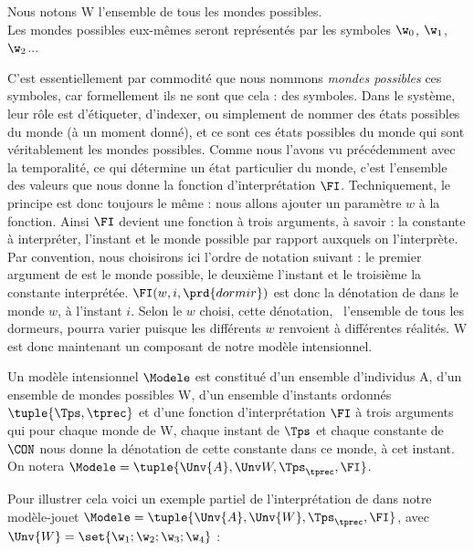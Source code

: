 \begin{nota}
Nous notons \Unv W l'ensemble de tous les mondes possibles.\\
Les mondes possibles eux-mêmes seront représentés par les symboles $\w_0$, $\w_1$, $\w_2$...
\end{nota}


C'est essentiellement par commodité que nous nommons \emph{mondes possibles} ces symboles, car formellement ils ne sont que cela : des symboles.  Dans le système, leur rôle est d'étiqueter, d'indexer, ou simplement de nommer des états possibles du monde (à un moment donné), et ce sont ces états possibles du monde qui sont véritablement les mondes possibles.  Comme nous l'avons vu précédemment avec la temporalité, ce qui détermine un état particulier du monde, c'est l'ensemble des valeurs que nous donne la fonction d'interprétation $\FI$. 
Techniquement, le principe est donc toujours le même :
nous allons ajouter un paramètre $w$ à la fonction.
Ainsi 
$\FI$ devient une fonction à trois arguments, à savoir : la constante à
interpréter, l'instant et le monde possible par rapport auxquels on
l'interprète.  Par convention, nous choisirons ici l'ordre de notation
suivant : le premier argument de {\FI} est le monde possible, le
deuxième l'instant et le troisième la constante interprétée. 
$\FI(w,i,\prd{dormir})$ est donc la dénotation de  dans le
monde $w$, à l'instant $i$.  Selon le $w$ choisi, cette dénotation, \ie\ l'ensemble de tous les dormeurs, pourra varier puisque les différents $w$ renvoient à différentes réalités. 
\Unv W est donc maintenant un composant de notre modèle intensionnel.

\begin{defi}
Un modèle intensionnel $\Modele$ est constitué d'un ensemble d'individus \Unv A, d'un ensemble de mondes possibles \Unv W,
d'un ensemble d'instants ordonnés $\tuple{\Tps,\tprec}$ et d'une fonction d'interprétation $\FI$ à trois arguments qui pour chaque monde de \Unv W,  chaque instant de $\Tps$ et  chaque constante de $\CON$ nous donne la dénotation de cette constante dans ce monde, à cet instant.
\\
On notera \(\Modele = \tuple{\Unv{A},\Unv W,\Tps_{\tprec},\FI}\).
\end{defi}




Pour illustrer cela voici un exemple partiel de l'interprétation de
 dans notre modèle-jouet \(\Modele  =
\tuple{\Unv{A},\Unv{W},\Tps_{\tprec},\FI}\), avec
$\Unv{W}=\set{\w_1;\w_2;\w_3;\w_4}$ : 

